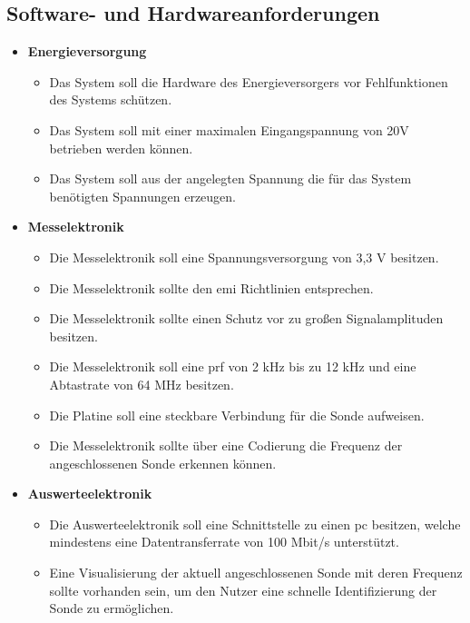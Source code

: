 \subsection*{Software- und Hardwareanforderungen}
\begin{itemize}\itemsep0pt
	\item \textbf{Energieversorgung}
	\begin{itemize}\itemsep0pt
		\item Das System soll die Hardware des Energieversorgers vor Fehlfunktionen des Systems schützen.%
		\item Das System soll mit einer maximalen Eingangspannung von 20V betrieben werden können.
		\item Das System soll aus der angelegten Spannung die für das System benötigten Spannungen erzeugen.
	\end{itemize}
\end{itemize}
\begin{itemize}\itemsep0pt
	\item \textbf{Messelektronik}
	\begin{itemize}\itemsep0pt
		\item Die Messelektronik soll eine Spannungsversorgung von 3,3 V besitzen.
		\item Die Messelektronik sollte den \ac{emi} Richtlinien entsprechen.
		\item Die Messelektronik sollte einen Schutz vor zu großen Signalamplituden besitzen.
		\item Die Messelektronik soll eine \ac{prf} von 2 kHz bis zu 12 kHz und eine Abtastrate von 64 MHz besitzen.
		\item Die Platine soll eine steckbare Verbindung für die Sonde aufweisen.
		\item Die Messelektronik sollte über eine Codierung die Frequenz der angeschlossenen Sonde erkennen können.
	\end{itemize}
\end{itemize}
\begin{itemize}\itemsep0pt
	\item \textbf{Auswerteelektronik}
	\begin{itemize}\itemsep0pt
		\item Die Auswerteelektronik soll eine Schnittstelle zu einen \ac{pc} besitzen, welche mindestens eine Datentransferrate von 100 Mbit/s unterstützt.
		\item Eine Visualisierung der aktuell angeschlossenen Sonde mit deren Frequenz sollte vorhanden sein, um den Nutzer eine schnelle Identifizierung der Sonde zu ermöglichen.
	\end{itemize}
\end{itemize}

